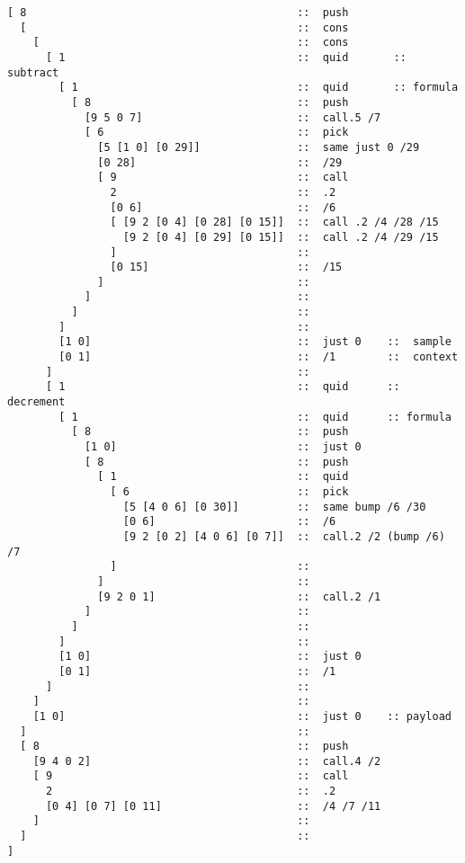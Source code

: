 \begin{framed_shaded}
\begin{Verbatim}[fontsize=\relsize{-2.5},fontseries=b,commandchars=\\\{\}]
[ 8                                          ::  push
  [                                          ::  cons
    [                                        ::  cons
      [ 1                                    ::  quid       :: subtract
        [ 1                                  ::  quid       :: formula
          [ 8                                ::  push
            [9 5 0 7]                        ::  call.5 /7
            [ 6                              ::  pick
              [5 [1 0] [0 29]]               ::  same just 0 /29
              [0 28]                         ::  /29
              [ 9                            ::  call
                2                            ::  .2
                [0 6]                        ::  /6
                [ [9 2 [0 4] [0 28] [0 15]]  ::  call .2 /4 /28 /15
                  [9 2 [0 4] [0 29] [0 15]]  ::  call .2 /4 /29 /15
                ]                            ::
                [0 15]                       ::  /15
              ]                              ::
            ]                                ::
          ]                                  ::
        ]                                    ::
        [1 0]                                ::  just 0    ::  sample
        [0 1]                                ::  /1        ::  context
      ]                                      :: 
      [ 1                                    ::  quid      :: decrement
        [ 1                                  ::  quid      :: formula
          [ 8                                ::  push
            [1 0]                            ::  just 0
            [ 8                              ::  push
              [ 1                            ::  quid
                [ 6                          ::  pick
                  [5 [4 0 6] [0 30]]         ::  same bump /6 /30
                  [0 6]                      ::  /6
                  [9 2 [0 2] [4 0 6] [0 7]]  ::  call.2 /2 (bump /6) /7
                ]                            ::
              ]                              ::
              [9 2 0 1]                      ::  call.2 /1
            ]                                ::
          ]                                  ::
        ]                                    ::
        [1 0]                                ::  just 0
        [0 1]                                ::  /1
      ]                                      ::
    ]                                        ::
    [1 0]                                    ::  just 0    :: payload
  ]                                          :: 
  [ 8                                        ::  push
    [9 4 0 2]                                ::  call.4 /2
    [ 9                                      ::  call
      2                                      ::  .2
      [0 4] [0 7] [0 11]                     ::  /4 /7 /11
    ]                                        ::
  ]                                          ::
]
\end{Verbatim}
\end{framed_shaded}
